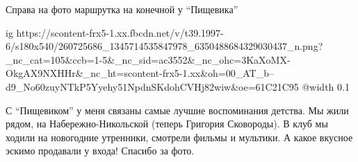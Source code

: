 
 
 
 
 

Справа на фото маршрутка на конечной у \enquote{Пищевика}


\ifcmt
  ig https://scontent-frx5-1.xx.fbcdn.net/v/t39.1997-6/s180x540/260725686_1345714535847978_6350488684329030437_n.png?_nc_cat=105&ccb=1-5&_nc_sid=ac3552&_nc_ohc=3KaXoMX-OkgAX9NXHHr&_nc_ht=scontent-frx5-1.xx&oh=00_AT_b--d9_No60zuyNTkP5Yyehy51NpdnSKdohCVHj82wiw&oe=61C21C95
  @width 0.1
\fi


С \enquote{Пищевиком} у меня связаны самые лучшие воспоминания детства. Мы жили рядом,
на Набережно-Никольской (теперь Григория Сковороды). В клуб мы ходили на
новогодние утренники, смотрели фильмы и мультики. А какое вкусное эскимо
продавали у входа! Спасибо за фото.
